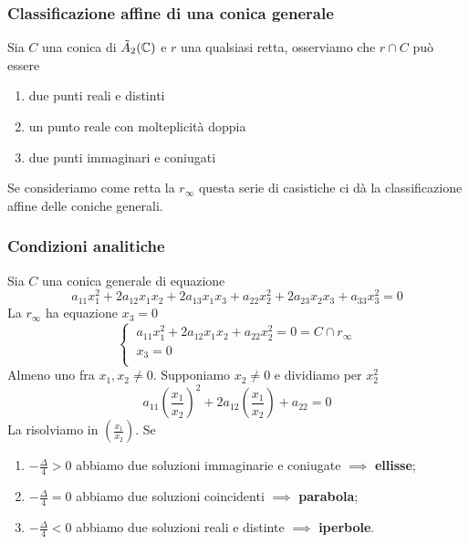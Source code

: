 \subsubsection{Classificazione affine di una conica generale}
Sia \(C\) una conica di \(\tilde{A}_{2}(\CC) \) e \(r\) una qualsiasi retta, osserviamo che \(r \cap C\) può essere
\begin{enumerate}
    \item due punti reali e distinti
    \item un punto reale con molteplicità doppia
    \item due punti immaginari e coniugati
\end{enumerate}
Se consideriamo come retta la \(r_{\infty}\) questa serie di casistiche ci dà la classificazione affine delle coniche generali.


\subsubsection{Condizioni analitiche}
Sia \(C\) una conica generale di equazione \[
a_{11}x_1^2+ 2a_{12}x_1x_2+2a_{13}x_1x_3+a_{22}x_2^2+2a_{23}x_2x_3+a_{33}x_3^2=0
\] 
La \(r_{\infty}\) ha equazione \(x_{3}=0\) \[
\begin{cases}
    \ a_{11}x_1^2+2a_{12}x_1x_2+a_{22}x_2^2= 0 = C \cap r_{\infty} \\
    \ x_3 = 0 \\
\end{cases}
\]
Almeno uno fra \(x_1, x_2 \neq 0\). Supponiamo \(x_2 \neq 0\) e dividiamo per \(x_2^2\) \[
a_{11} \left( \frac{x_1}{x_2} \right) ^2 + 2a_{12} \left( \frac{x_1}{x_2} \right)  + a_{22} = 0
\] 
La risolviamo in \(\left( \frac{x_1}{x_2} \right) \). Se 
\begin{enumerate}
    \item \(-\frac{\Delta}{4} > 0\) abbiamo due soluzioni immaginarie e coniugate \(\implies \) \textbf{ellisse};
    \item \(-\frac{\Delta}{4} = 0\) abbiamo due soluzioni coincidenti \(\implies \) \textbf{parabola};
    \item \(-\frac{\Delta}{4} < 0\) abbiamo due soluzioni reali e distinte \(\implies \) \textbf{iperbole}.
\end{enumerate}

